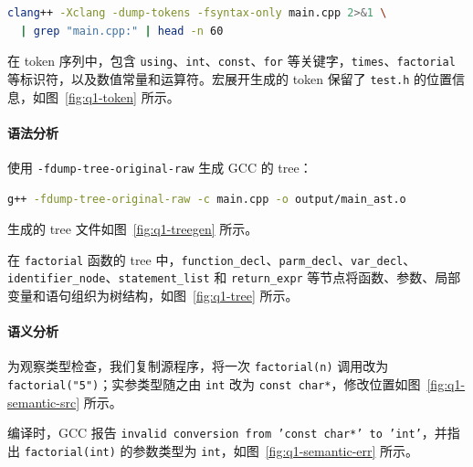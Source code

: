 \begin{lstlisting}[language=bash]
clang++ -Xclang -dump-tokens -fsyntax-only main.cpp 2>&1 \
  | grep "main.cpp:" | head -n 60
\end{lstlisting}

在 token 序列中，包含 \texttt{using}、\texttt{int}、\texttt{const}、\texttt{for} 等关键字，\texttt{times}、\texttt{factorial} 等标识符，以及数值常量和运算符。宏展开生成的 token 保留了 \texttt{test.h} 的位置信息，如图~\ref{fig:q1-token} 所示。



\paragraph{语法分析}

使用 \texttt{-fdump-tree-original-raw} 生成 GCC 的 tree：

\begin{lstlisting}[language=bash]
g++ -fdump-tree-original-raw -c main.cpp -o output/main_ast.o
\end{lstlisting}

生成的 tree 文件如图~\ref{fig:q1-treegen} 所示。


在 \texttt{factorial} 函数的 tree 中，\texttt{function\_decl}、\texttt{parm\_decl}、\texttt{var\_decl}、\texttt{identifier\_node}、\texttt{statement\_list} 和 \texttt{return\_expr} 等节点将函数、参数、局部变量和语句组织为树结构，如图~\ref{fig:q1-tree} 所示。



\paragraph{语义分析}

为观察类型检查，我们复制源程序，将一次 \texttt{factorial(n)} 调用改为 \texttt{factorial("5")}；实参类型随之由 \texttt{int} 改为 \texttt{const char*}，修改位置如图~\ref{fig:q1-semantic-src} 所示。


编译时，GCC 报告 \texttt{invalid conversion from 'const char*' to 'int'}，并指出 \texttt{factorial(int)} 的参数类型为 \texttt{int}，如图~\ref{fig:q1-semantic-err} 所示。


